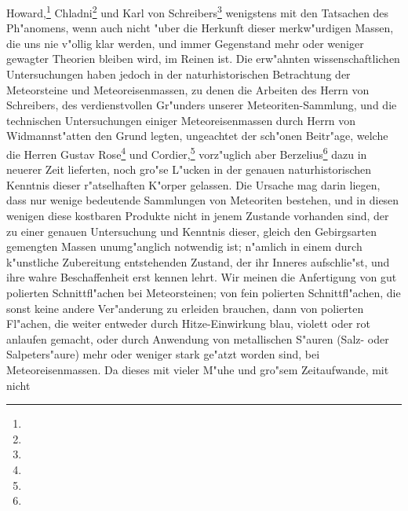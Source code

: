 \documentclass[a4paper, 11pt, oneside, polutonikogreek, german]{article}
\begin{document}
Howard,\footnote{} Chladni\footnote{} und Karl von Schreibers\footnote{} wenigstens mit den Tatsachen des Ph"anomens, wenn auch nicht "uber die Herkunft dieser merkw"urdigen Massen, die uns nie v"ollig klar werden, und immer Gegenstand mehr oder weniger gewagter Theorien bleiben wird, im Reinen ist. Die erw"ahnten wissenschaftlichen Untersuchungen haben jedoch in der naturhistorischen Betrachtung der Meteorsteine und Meteoreisenmassen, zu denen die Arbeiten des Herrn von Schreibers, des verdienstvollen Gr"unders unserer Meteoriten-Sammlung, und die technischen Untersuchungen einiger Meteoreisenmassen durch Herrn von Widmannst"atten den Grund legten, ungeachtet der sch"onen Beitr"age, welche die Herren Gustav Rose\footnote{} und Cordier,\footnote{} vorz"uglich aber Berzelius\footnote{} dazu in neuerer Zeit lieferten, noch gro"se L"ucken in der genauen naturhistorischen Kenntnis dieser r"atselhaften K"orper gelassen. Die Ursache mag darin liegen, dass nur wenige bedeutende Sammlungen von Meteoriten bestehen, und in diesen wenigen diese kostbaren Produkte nicht in jenem Zustande vorhanden sind, der zu einer genauen Untersuchung und Kenntnis dieser, gleich den Gebirgsarten gemengten Massen unumg"anglich notwendig ist; n"amlich in einem durch k"unstliche Zubereitung entstehenden Zustand, der ihr Inneres aufschlie"st, und ihre wahre Beschaffenheit erst kennen lehrt. Wir meinen die Anfertigung von gut polierten Schnittfl"achen bei Meteorsteinen; von fein polierten Schnittfl"achen, die sonst keine andere Ver"anderung zu erleiden brauchen, dann von polierten Fl"achen, die weiter entweder durch Hitze-Einwirkung blau, violett oder rot anlaufen gemacht, oder durch Anwendung von metallischen S"auren (Salz- oder Salpeters"aure) mehr oder weniger stark ge"atzt worden sind, bei Meteoreisenmassen. Da dieses mit vieler M"uhe und gro"sem Zeitaufwande, mit nicht 
\end{document}
